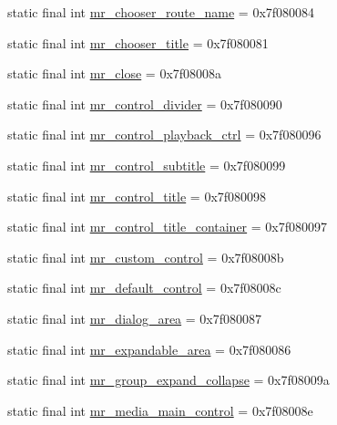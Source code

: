 \begin{CompactItemize}
\item 
static final int \hyperlink{classandroid_1_1support_1_1v4_1_1_r_1_1id_25b6c5de631ab068bc858453b8134f0c}{mr\_\-chooser\_\-route\_\-name} = 0x7f080084
\item 
static final int \hyperlink{classandroid_1_1support_1_1v4_1_1_r_1_1id_700e72c038b676b32fb1fb0140142eb9}{mr\_\-chooser\_\-title} = 0x7f080081
\item 
static final int \hyperlink{classandroid_1_1support_1_1v4_1_1_r_1_1id_50f45b1499cc2a5c957a9bd9ec4d46c0}{mr\_\-close} = 0x7f08008a
\item 
static final int \hyperlink{classandroid_1_1support_1_1v4_1_1_r_1_1id_97b81a2119340e857a193c020651d941}{mr\_\-control\_\-divider} = 0x7f080090
\item 
static final int \hyperlink{classandroid_1_1support_1_1v4_1_1_r_1_1id_dea2dc7e73025ba8425a710410519816}{mr\_\-control\_\-playback\_\-ctrl} = 0x7f080096
\item 
static final int \hyperlink{classandroid_1_1support_1_1v4_1_1_r_1_1id_19e04a81c95972cac78e69091c96c55d}{mr\_\-control\_\-subtitle} = 0x7f080099
\item 
static final int \hyperlink{classandroid_1_1support_1_1v4_1_1_r_1_1id_785924c00518edca476aaa5b8fdde5ad}{mr\_\-control\_\-title} = 0x7f080098
\item 
static final int \hyperlink{classandroid_1_1support_1_1v4_1_1_r_1_1id_c6cf21bd15f73957f889c745e9fbb292}{mr\_\-control\_\-title\_\-container} = 0x7f080097
\item 
static final int \hyperlink{classandroid_1_1support_1_1v4_1_1_r_1_1id_efaf24fd497260d314857ec170f1c476}{mr\_\-custom\_\-control} = 0x7f08008b
\item 
static final int \hyperlink{classandroid_1_1support_1_1v4_1_1_r_1_1id_dde082062b9885a830e8be828bbc13ac}{mr\_\-default\_\-control} = 0x7f08008c
\item 
static final int \hyperlink{classandroid_1_1support_1_1v4_1_1_r_1_1id_a4fc8171f10ff9e59e67c9abfe087d9d}{mr\_\-dialog\_\-area} = 0x7f080087
\item 
static final int \hyperlink{classandroid_1_1support_1_1v4_1_1_r_1_1id_1246c4d8cf98d51365aee4fad816203f}{mr\_\-expandable\_\-area} = 0x7f080086
\item 
static final int \hyperlink{classandroid_1_1support_1_1v4_1_1_r_1_1id_03e3c6a6777a1688abca857ee0841a07}{mr\_\-group\_\-expand\_\-collapse} = 0x7f08009a
\item 
static final int \hyperlink{classandroid_1_1support_1_1v4_1_1_r_1_1id_5c829f3f143ecd2ab6aa2080e6b2be82}{mr\_\-media\_\-main\_\-control} = 0x7f08008e

\end{CompactItemize}
